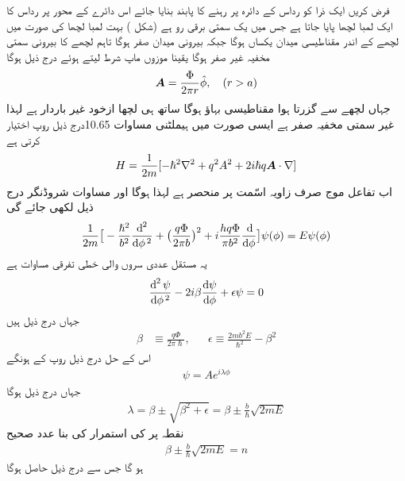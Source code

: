  فرض کریں ایک ذرا کو رداس  کے دائرہ پر رہنے کا پابند بنایا جائے اس دائرے کے محور پر رداس  کا ایک لمبا لچھا پایا جاتا ہے جس میں یک سمتی برقی رو  ہے  (شکل  )   بہت لمبا لچھا کی صورت میں لچھے کے اندر مقناطیسی میدان یکساں ہوگا جبکہ بیرونی میدان صفر ہوگا تاہم لچھے کا بیرونی سمتی مخفیہ غیر صفر ہوگا یقینا موزوں ماپ شرط  لیتے ہوئے درج ذیل ہوگا 
\begin{align}
{\ensuremath{{\boldsymbol{A}}}} = \frac{\Phi}{2\pi r} \hat{\phi}, \quad (r > a)
\end{align}
جہاں  لچھے سے گزرتا ہوا  مقناطیسی بہاؤ ہوگا ساتھ ہی لچھا ازخود غیر باردار ہے لہذا غیر سمتی مخفیہ  صفر ہے ایسی صورت میں ہیملٹنی مساوات 10.65درج ذیل روپ اختیار کرتی ہے 
\begin{align}
H = \frac{1}{2m} [- \hslash^2 \nabla^2 + q^2 A^2 + 2 i \hslash q {{\boldsymbol{A}}} \cdot \nabla]
\end{align}
اب تفاعل موج صرف زاویہ اسّمت  پر منحصر ہے لہذا  ہوگا اور مساوات شروڈنگر درج ذیل لکھی جائے گی 
\begin{align}
\frac{1}{2m} \big [ - \frac{\hslash^2}{b^2} \frac{\dif^{\,2}}{\dif \phi^{\,2}} + \big ( \frac{q \Phi}{2 \pi b} \big )^2 + i \frac{h q \Phi}{\pi b^2} \frac{\dif}{\dif \phi} \big ] \psi (\phi) = E \psi (\phi)
\end{align}
یہ مستقل عددی سروں والی خطی تفرقی مساوات ہے
\begin{align}
\frac{\dif^{\,2} \psi}{\dif \phi^{\,2}} - 2i \beta \frac{\dif \psi}{\dif \phi} + \epsilon \psi = 0
\end{align}
جہاں درج ذیل ہیں
\begin{align}
\beta &\equiv \frac{q \Phi}{2 \pi \hslash}, && \epsilon \equiv \frac{2 m b ^2 E}{\hslash^2} - \beta^2
\end{align}
اس کے حل درج ذیل روپ کے ہونگے 
\begin{align}
\psi = Ae^{i \lambda \phi}
\end{align}
جہاں درج ذیل ہوگا 
\begin{align}
\lambda = \beta \pm \sqrt{ \beta^2 + \epsilon} = \beta \pm \frac{b}{\hslash} \sqrt{2 m E}
\end{align}
نقطہ  پر  کی استمرار کی بنا  عدد صحیح
\begin{align}
\beta \pm \frac{b}{\hslash} \sqrt{2m E} = n
\end{align} 
ہو گا جس سے درج ذیل حاصل ہوگا 
